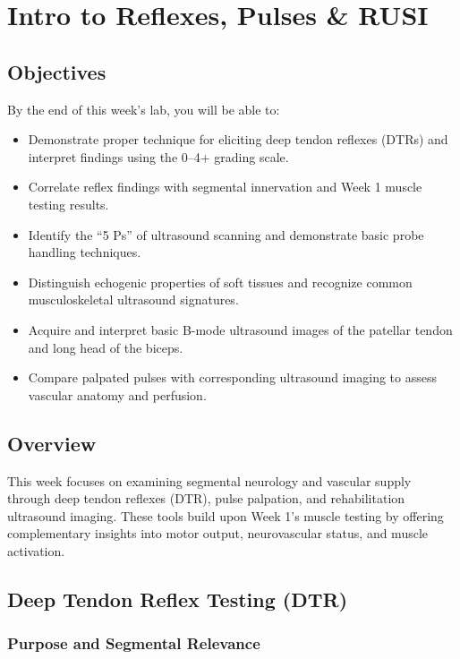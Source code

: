 \chapter{Intro to Reflexes, Pulses \& RUSI}\label{chp:reflex_pulse}

\section*{Objectives}

By the end of this week’s lab, you will be able to:

\begin{itemize}
  \item Demonstrate proper technique for eliciting deep tendon reflexes (DTRs) and interpret findings using the 0–4+ grading scale.
  \item Correlate reflex findings with segmental innervation and Week 1 muscle testing results.
  \item Identify the “5 Ps” of ultrasound scanning and demonstrate basic probe handling techniques.
  \item Distinguish echogenic properties of soft tissues and recognize common musculoskeletal ultrasound signatures.
  \item Acquire and interpret basic B-mode ultrasound images of the patellar tendon and long head of the biceps.
  \item Compare palpated pulses with corresponding ultrasound imaging to assess vascular anatomy and perfusion.
\end{itemize}

\section*{Overview}
This week focuses on examining segmental neurology and vascular supply through deep tendon reflexes (DTR), pulse palpation, and rehabilitation ultrasound imaging. These tools build upon Week 1’s muscle testing by offering complementary insights into motor output, neurovascular status, and muscle activation.

\section*{Deep Tendon Reflex Testing (DTR)}

\subsection*{Purpose and Segmental Relevance}

